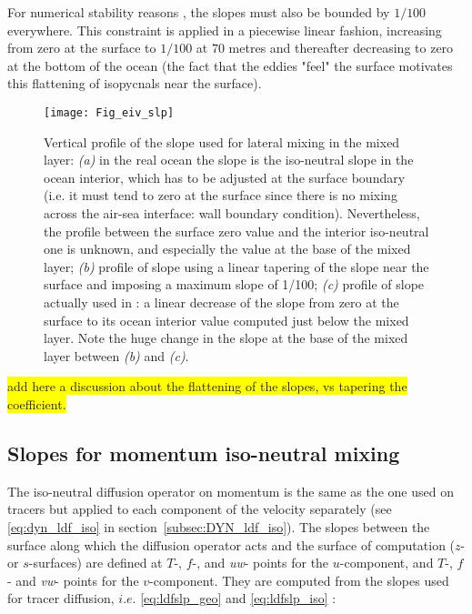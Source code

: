 \documentclass[../tex_main/NEMO_manual]{subfiles}
\begin{document}
For numerical stability reasons \citep{Cox1987, Griffies_Bk04}, the slopes must also be bounded by
$1/100$ everywhere.
This constraint is applied in a piecewise linear fashion, increasing from zero at the surface to
$1/100$ at $70$ metres and thereafter decreasing to zero at the bottom of the ocean
(the fact that the eddies "feel" the surface motivates this flattening of isopycnals near the surface).

\begin{figure}[!ht]
  \begin{center}
    \texttt{[image: Fig\_eiv\_slp]}
    \caption {     \protect\label{fig:eiv_slp}
      Vertical profile of the slope used for lateral mixing in the mixed layer:
      \textit{(a)} in the real ocean the slope is the iso-neutral slope in the ocean interior,
      which has to be adjusted at the surface boundary
      (i.e. it must tend to zero at the surface since there is no mixing across the air-sea interface:
      wall boundary condition).
      Nevertheless, the profile between the surface zero value and the interior iso-neutral one is unknown,
      and especially the value at the base of the mixed layer;
      \textit{(b)} profile of slope using a linear tapering of the slope near the surface and
      imposing a maximum slope of 1/100;
      \textit{(c)} profile of slope actually used in \NEMO: a linear decrease of the slope from
      zero at the surface to its ocean interior value computed just below the mixed layer.
      Note the huge change in the slope at the base of the mixed layer between \textit{(b)} and \textit{(c)}.}
  \end{center}
\end{figure}

\colorbox{yellow}{add here a discussion about the flattening of the slopes, vs tapering the coefficient.}

\subsection{Slopes for momentum iso-neutral mixing}

The iso-neutral diffusion operator on momentum is the same as the one used on tracers but
applied to each component of the velocity separately
(see \autoref{eq:dyn_ldf_iso} in section~\autoref{subsec:DYN_ldf_iso}).
The slopes between the surface along which the diffusion operator acts and the surface of computation
($z$- or $s$-surfaces) are defined at $T$-, $f$-, and \textit{uw}- points for the $u$-component, and $T$-, $f$- and
\textit{vw}- points for the $v$-component.
They are computed from the slopes used for tracer diffusion,
$i.e.$ \autoref{eq:ldfslp_geo} and \autoref{eq:ldfslp_iso} :
\end{document}
